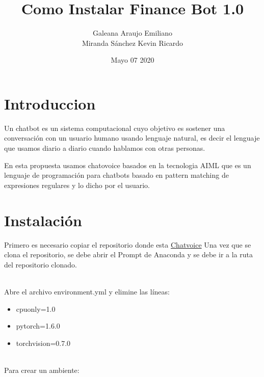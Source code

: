\documentclass{article}
\title{\huge Como Instalar Finance Bot 1.0}
\author{Galeana Araujo Emiliano \\ Miranda Sánchez Kevin Ricardo \\}
\date{Mayo 07 2020}
\begin{document}
\maketitle

\newpage

\section{Introduccion}

\justifying
Un chatbot es un sistema computacional cuyo objetivo es sostener una conversación con un usuario humano usando lenguaje natural, es decir el lenguaje que usamos diario a diario cuando hablamos con otras personas.\par

En esta propuesta usamos chatovoice basados en la tecnologia AIML que es un lenguaje de programación para chatbots basado en pattern matching de expresiones regulares y lo dicho por el usuario.

\newpage
\section{Instalación}
Primero es necesario copiar el repositorio donde esta \href{https://github.com/ivanvladimir/chatvoice}{Chatvoice}
Una vez que se clona el repositorio, se debe abrir el Prompt de Anaconda y se debe ir a la ruta del repositorio clonado.\par \\

Abre el archivo environment.yml y elimine las líneas:
\begin{itemize}
    \item cpuonly=1.0
    \item pytorch=1.6.0
    \item torchvision=0.7.0
\end{itemize} \\

Para crear un ambiente: \\


\end{document}
